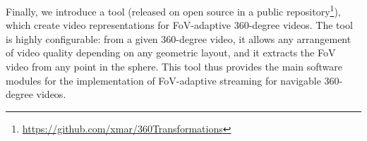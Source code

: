 Finally, we introduce a tool (released on open source in a public
repository\footnote{\url{https://github.com/xmar/360Transformations}}),
which create video representations for
\ac{FoV}-adaptive 360-degree videos.
The tool is highly configurable: from a given 360-degree video, it allows
any arrangement of video quality depending on any geometric layout, and it
extracts the
\ac{FoV} video from any point in the sphere. This tool thus provides the
main software modules for the implementation of \ac{FoV}-adaptive streaming
for navigable 360-degree videos.


%
%
%
%


